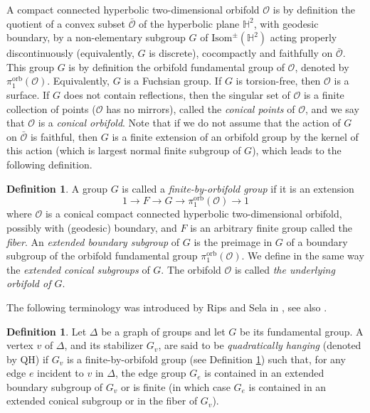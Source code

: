 \documentclass[a4paper, 11pt]{amsart}
\theoremstyle{definition}
\newtheorem{de}[te]{Definition}
\theoremstyle{remark}
\begin{document}
A compact connected hyperbolic two-dimensional orbifold $\mathcal{O}$ is by definition the quotient of a convex subset $\bar{\mathcal{O}}$ of the hyperbolic plane $\mathbb{H}^2$, with geodesic boundary, by a non-elementary subgroup $G$ of $\mathrm{Isom}^{\pm}(\mathbb{H}^2)$ acting properly discontinuously (equivalently, $G$ is discrete), cocompactly and faithfully on $\bar{\mathcal{O}}$. This group $G$ is by definition the orbifold fundamental group of $\mathcal{O}$, denoted by $\pi_1^{\mathrm{orb}}(\mathcal{O})$. Equivalently, $G$ is a Fuchsian group. If $G$ is torsion-free, then $\mathcal{O}$ is a surface. If $G$ does not contain reflections, then the singular set of $\mathcal{O}$ is a finite collection of points ($\mathcal{O}$ has no mirrors), called the \emph{conical points} of $\mathcal{O}$, and we say that $\mathcal{O}$ is a \emph{conical orbifold}. Note that if we do not assume that the action of $G$ on $\bar{\mathcal{O}}$ is faithful, then $G$ is a finite extension of an orbifold group by the kernel of this action (which is largest normal finite subgroup of $G$), which leads to the following definition.

\begin{de}\label{FBO}A group $G$ is called a \emph{finite-by-orbifold group} if it is an extension \[1\rightarrow F\rightarrow G \rightarrow \pi_1^{\mathrm{orb}}(\mathcal{O})\rightarrow 1\]where $\mathcal{O}$ is a conical compact connected hyperbolic two-dimensional orbifold, possibly with (geodesic) boundary, and $F$ is an arbitrary finite group called the \emph{fiber}. An \emph{extended boundary subgroup} of $G$ is the preimage in $G$ of a boundary subgroup of the orbifold fundamental group $\pi_1^{\mathrm{orb}}(\mathcal{O})$. We define in the same way the \emph{extended conical subgroups} of $G$. The orbifold $\mathcal{O}$ is called \emph{the underlying orbifold of $G$}.\end{de}

The following terminology was introduced by Rips and Sela in \cite{RS97}, see also \cite[Definition 5.13]{GL16}.

\begin{de}\label{QH}Let $\Delta$ be a graph of groups and let $G$ be its fundamental group. A vertex $v$ of $\Delta$, and its stabilizer $G_v$, are said to be \emph{quadratically hanging} (denoted by QH) if $G_v$ is a finite-by-orbifold group (see Definition \ref{FBO}) such that, for any edge $e$ incident to $v$ in $\Delta$, the edge group $G_e$ is contained in an extended boundary subgroup of $G_v$ or is finite (in which case $G_e$ is contained in an extended conical subgroup or in the fiber of $G_v$).\end{de}
\end{document}
